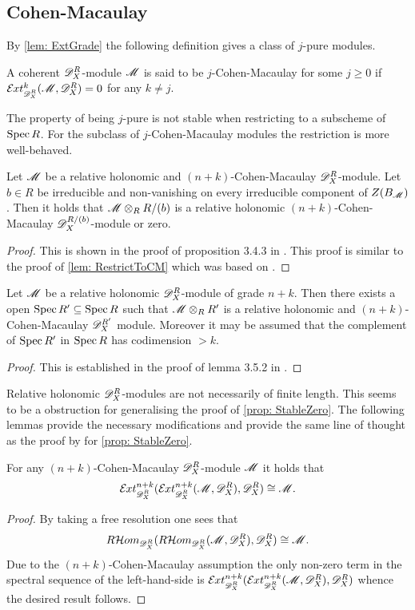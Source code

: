 \subsection{Cohen-Macaulay}
By \cref{lem: ExtGrade} the following definition gives a class of $j$-pure modules.
\begin{definition}
  A coherent $\mathscr{D}_X^R$-module $\mathscr{M}$ is said to be $j$-Cohen-Macaulay for some $j\geq 0$ if $\Ex{\D_X^R}{k}(\M,\D_X^R) = 0$ for any $k\neq j$.
\end{definition}
The property of being $j$-pure is not stable when restricting to a subscheme of $\operatorname{Spec} R$.
For the subclass of $j$-Cohen-Macaulay modules the restriction is more well-behaved.
\begin{lemma}\label{lem: CMLemmaBudur}
  Let $\mathscr{M}$ be a relative holonomic and $(n+k)$-Cohen-Macaulay $\mathscr{D}_X^R$-module. Let $b\in R$ be irreducible and non-vanishing on every irreducible component of $Z(B_{\mathscr{M}})$. Then it holds that $\mathscr{M}\otimes_R R/(b)$ is a relative holonomic $(n+k)$-Cohen-Macaulay $\mathscr{D}_X^{R/(b)}$-module or zero.
\end{lemma}
\begin{proof}
  This is shown in the proof of proposition 3.4.3 in \cite{budur2019zero}. This proof is similar to the proof of \cref{lem: RestrictToCM} which was based on \cite{budur2019zero}.
\end{proof}
\begin{lemma}\label{lem: GradeToCMOverOpen}
  Let $\mathscr{M}$ be a relative holonomic $\mathscr{D}_X^R$-module of grade $n+k$. Then there exists a open $\operatorname{Spec} R' \subseteq \operatorname{Spec} R$ such that $\mathscr{M}\otimes_R R'$ is a relative holonomic and $(n+k)$-Cohen-Macaulay $\mathscr{D}_X^{R'}$ module. Moreover it may be assumed that the complement of $\operatorname{Spec} R'$ in $\operatorname{Spec} R$ has codimension $>k$.
\end{lemma}
\begin{proof}
  This is established in the proof of lemma 3.5.2 in \cite{budur2019zero}.
\end{proof}
Relative holonomic $\mathscr{D}_X^R$-modules are not necessarily of finite length.
This seems to be a obstruction for generalising the proof of \cref{prop: StableZero}.
The following lemmas provide the necessary modifications and provide the same line of thought as the proof by \cite{kashiwara1976b} for \cref{prop: StableZero}.
\begin{lemma}
  For any $(n+k)$-Cohen-Macaulay $\mathscr{D}_X^R$-module $\mathscr{M}$ it holds that  $$\Ex{\D_X^R}{n+k}(\Ex{\D_X^R}{n+k}(\M,\D_X^R),\D_X^R) \cong \M.$$
\end{lemma}
\begin{proof}
  By taking a free resolution one sees that
  $$R\mathcal{H}om_{\mathscr{D}_X^R}(R\mathcal{H}om_{\mathscr{D}_X^R}(\mathscr{M}, \mathscr{D}_X^R),\mathscr{D}_X^R) \cong \mathscr{M}.$$
  Due to the $(n+k)$-Cohen-Macaulay assumption the only non-zero term in the spectral sequence of the left-hand-side is $\Ex{\D_X^R}{n+k}(\Ex{\D_X^R}{n+k}(\M,\D_X^R),\D_X^R)$ whence the desired result follows.
\end{proof}

